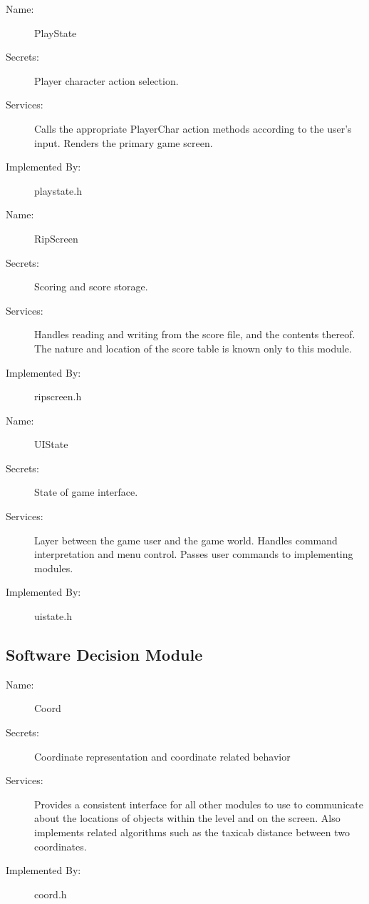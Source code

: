 \documentclass[12pt, titlepage]{article}
\begin{document}
        \bigskip\begin{description}
            \item[Name:]PlayState
            \item[Secrets:]Player character action selection.
            \item[Services:]Calls the appropriate PlayerChar action methods according to the user's input.  Renders the primary game screen.
            \item[Implemented By:]playstate.h
        \end{description}

        \bigskip\begin{description}
            \item[Name:]RipScreen
            \item[Secrets:]Scoring and score storage.
            \item[Services:]Handles reading and writing from the score file, and the contents thereof. The nature and location of the score table is known only to this module.
            \item[Implemented By:]ripscreen.h
        \end{description}

        \bigskip\begin{description}
            \item[Name:]UIState
            \item[Secrets:]State of game interface.
            \item[Services:]Layer between the game user and the game world. Handles command interpretation and menu control. Passes user commands to implementing modules.
            \item[Implemented By:]uistate.h
        \end{description}

    \subsection{Software Decision Module}

        \bigskip\begin{description}
            \item[Name:]Coord
            \item[Secrets:]Coordinate representation and coordinate related behavior
            \item[Services:]Provides a consistent interface for all other modules to use to communicate about the locations of objects within the level and on the screen. Also implements related algorithms such as the taxicab distance between two coordinates.
            \item[Implemented By:]coord.h
        \end{description}
\end{document}
